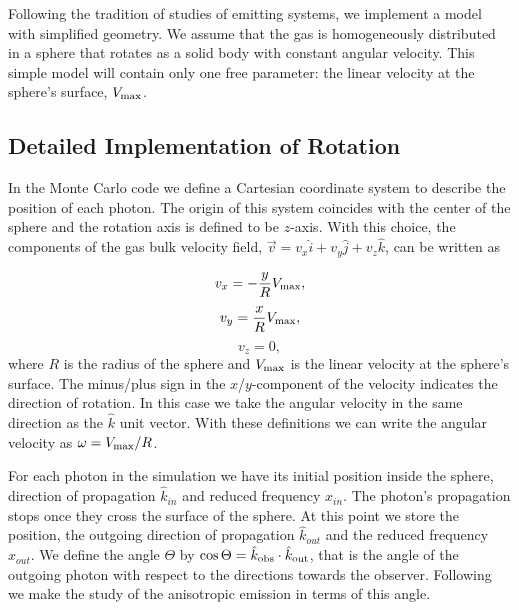 \documentclass{emulateapj}
\newcommand{\ly}{{\ifmmode{{\rm Ly}\alpha~}\else{Ly$\alpha$~}\fi}}
\begin{document}
Following the tradition of studies of \ly emitting systems,
we implement a model with simplified geometry. We assume that the gas
is homogeneously distributed in a sphere that rotates as a solid body
with constant angular velocity. This simple model will contain only
one free parameter: the linear velocity at the sphere's surface, $V_{\rm
  max}$. 

\subsection{Detailed Implementation of Rotation}

 In the Monte Carlo code we define a Cartesian coordinate system to
 describe the position of each photon. The origin of this system
 coincides with the center of the sphere and the rotation axis is defined
 to be $z$-axis. With this choice, the components of the gas bulk velocity
 field, $\vec{v} = v_{x}\hat{i} + v_{y}\hat{j} + v_{z}\hat{k}$, can be
 written as  
  
\begin{equation}
    v_{x}=-\frac{y}{R}V_{\rm max}, \label{subeq1}
\end{equation}
\begin{equation}
    v_{y}=\frac{x}{R}V_{\rm max}, \label{subeq2}
\end{equation}
\begin{equation}
    v_{z}=0, \label{subeq3}
\end{equation}
%
where $R$ is the radius of the sphere and $V_{\rm max}$ is the linear
velocity at the sphere's surface. The minus/plus sign in the
$x$/$y$-component of the velocity indicates the direction of
rotation. In this case we take the angular velocity in the same
direction as the $\hat{k}$ unit vector. With these definitions we can
write the angular velocity as $\omega=V_{\rm max}/R$.  

For each photon in the simulation we have its initial position inside
the sphere, direction of propagation $\hat{k}_{in}$ and reduced
frequency $x_{in}$. The photon's propagation stops once they cross the
surface of the sphere. At this point we store the position, the outgoing direction
of propagation $\hat{k}_{out}$ and the reduced frequency $x_{out}$. We
define the angle $\Theta$ by $\cos\Theta = \hat{k}_{\rm obs}\cdot
\hat{k}_{\rm out}$, that is the angle of the outgoing photon with
respect to the directions towards the observer. Following
\cite{Zheng2013} we make the study of the anisotropic emission in
terms of this angle. 
\end{document}
